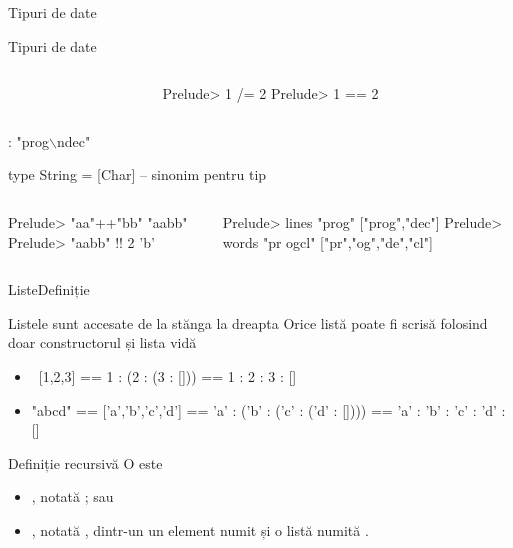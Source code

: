 \documentclass[xcolor=pdftex,romanian,colorlinks]{beamer}
\begin{document}
\begin{section}{Tipuri de date}
\begin{frame}[fragile]{Tipuri de date}
\begin{itemize}
\begin{columns}
\begin{column}{0.5\textwidth}
\begin{asciihs}
\end{asciihs}
\end{column}
\begin{column}{0.4\textwidth}
\begin{asciihs}
Prelude> 1 /= 2
Prelude> 1 == 2
\end{asciihs}
\end{column}
\end{columns}

\vitem{}:  "prog$\backslash$ndec"
\begin{asciihs}
type String = [Char] -- sinonim pentru tip
\end{asciihs}
\begin{columns}
\begin{column}{0.4\textwidth}
\begin{asciihs}
Prelude> "aa"++"bb"
"aabb"
Prelude> "aabb" !! 2
'b'
\end{asciihs}
\end{column}
\begin{column}{0.5\textwidth}
\begin{asciihs}
Prelude> lines "prog\ndec"
["prog","dec"]
Prelude> words "pr og\nde cl"
["pr","og","de","cl"]
\end{asciihs}
\end{column}
\end{columns}
\end{itemize}
\end{frame}

\begin{frame}{Liste}{Definiție}
\begin{block}{Listele sunt accesate de la stănga la dreapta}
Orice listă poate fi scrisă folosind doar constructorul \structure{(:)} și lista vidă \structure{[]}
\begin{itemize}
\item\ [1,2,3] == 1 : (2 : (3 : [])) == 1 : 2 : 3 : []
\item "abcd" == ['a','b','c','d'] == 'a' : ('b' : ('c' : ('d' : []))) == 'a' : 'b' : 'c' : 'd' : []
\end{itemize}
\end{block}
\vfill
\begin{block}{Definiție recursivă}
O  este
\begin{itemize}
\item {}, notată \structure{[]}; sau
\item {}, notată , dintr-un un element  numit  și o listă  numită .
\end{itemize}
\end{block}
\vfill
\end{frame}


\end{section}
\end{document}
